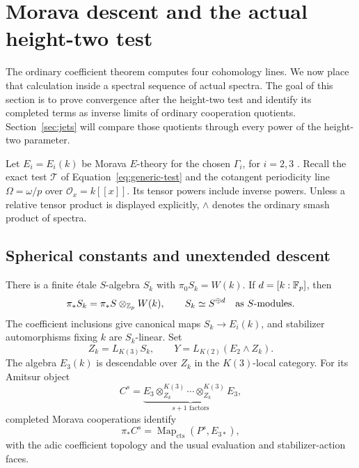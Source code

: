 \section{Morava descent and the actual height-two test}\label{sec:homotopy}

The ordinary coefficient theorem computes four cohomology lines. We now
place that calculation inside a spectral sequence of actual spectra.
The goal of this section is to prove convergence after the height-two test
and identify its completed terms as inverse limits of ordinary cooperation
quotients. Section~\ref{sec:jets} will compare those quotients through every
power of the height-two parameter.

Let \(E_i=E_i(k)\) be Morava \(E\)-theory for the chosen \(\Gamma_i\),
for \(i=2,3\) \citep{DH04,HS99}. Recall the exact test \(\mathcal T\) of
Equation~\eqref{eq:generic-test} and the cotangent periodicity line
\(\Omega=\omega/p\) over \(\mathcal O_x=k[[x]]\). Its tensor powers include
inverse powers. Unless a relative tensor product is displayed explicitly,
\(\wedge\) denotes the ordinary smash product of spectra.

\subsection{Spherical constants and unextended descent}

\begin{lemma}\label{lem:spherical-constants}
There is a finite \'{e}tale $S$-algebra $S_k$ with
$\pi_0S_k=W(k)$.  If $d=[k:\mathbb F_p]$, then
\begin{equation}\label{eq:spherical-constants}
  \pi_*S_k=\pi_*S\otimes_{\mathbb Z_p}W(k),\qquad
  S_k\simeq S^{\oplus d}
  \quad\text{as $S$-modules}.
\end{equation}
The coefficient inclusions give canonical maps $S_k\to E_i(k)$, and
stabilizer automorphisms fixing $k$ are $S_k$-linear.  Set
\begin{equation}\label{eq:test-spectra}
  Z_k=L_{K(3)}S_k,\qquad
  Y=L_{K(2)}(E_2\wedge Z_k).
\end{equation}
The algebra $E_3(k)$ is descendable over $Z_k$ in the $K(3)$-local
category.  For its Amitsur object
\begin{equation}\label{eq:morava-amitsur}
  C^s=\underbrace{E_3\otimes^{K(3)}_{Z_k}\cdots
                    \otimes^{K(3)}_{Z_k}E_3}_{s+1\text{ factors}},
\end{equation}
completed Morava cooperations identify
\begin{equation}\label{eq:unextended-cooperations}
  \pi_*C^s=\operatorname{Map}_{\mathrm{cts}}(P^s,E_{3*}),
\end{equation}
with the adic coefficient topology and the usual evaluation and
stabilizer-action faces.
\end{lemma}

